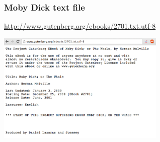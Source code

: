 \documentclass{beamer}\usepackage[]{graphicx}\usepackage[]{color}
\begin{document}
\begin{frame}
\frametitle{Moby Dick text file}

\url{http://www.gutenberg.org/ebooks/2701.txt.utf-8}

\begin{center}
\includegraphics[width=8cm]{images/moby_dick_book.png}
\end{center}

\end{frame}

\end{document}
